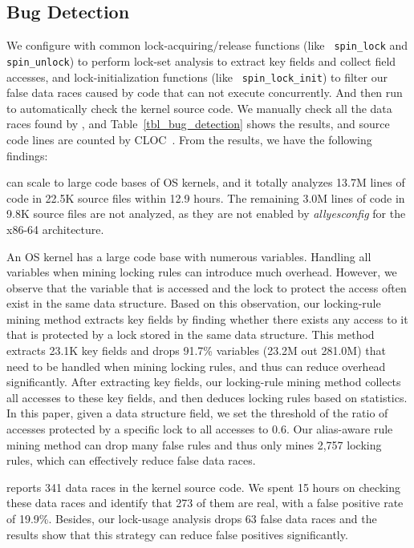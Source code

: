 \subsection{Bug Detection}
\label{subsec_bug_detection}

We configure \sys with common lock-acquiring/release functions (like {\tt 
spin\_lock} and {\tt spin\_unlock}) to perform lock-set analysis to extract key 
fields and collect field accesses, and lock-initialization functions (like {\tt 
spin\_lock\_init}) to filter our false data races caused by code that can not 
execute concurrently. And then run \sys to automatically check the kernel 
source code. We manually check all the data races found by \sys, and 
Table~\ref{tbl_bug_detection} shows the results, and source code lines are 
counted by CLOC~\cite{cloc}. From the results, we have the following findings:

 \sys can scale to large code bases of OS kernels, and it 
totally analyzes 13.7M lines of code in 22.5K source files within 12.9 hours. 
The remaining 3.0M lines of code in 9.8K source files are not analyzed, as they 
are not enabled by {\em allyesconfig} for the x86-64 architecture.

 An OS kernel has a large code base with numerous 
variables. Handling all variables when mining locking rules can introduce much 
overhead. However, we observe that the variable that is accessed and the lock 
to protect the access often exist in the same data structure. Based on this 
observation, our locking-rule mining method extracts key fields by finding 
whether there exists any access to it that is protected by a lock stored in the 
same data structure. This method extracts 23.1K key fields and drops 91.7\% 
variables (23.2M out 281.0M) that need to be handled when mining locking rules, 
and thus can reduce overhead significantly. After extracting key fields, our 
locking-rule mining method collects all accesses to these key fields, and then 
deduces locking rules based on statistics. In this paper, given a data 
structure field, we set the threshold of the ratio of accesses protected by a 
specific lock to all accesses to 0.6. Our alias-aware rule mining method can 
drop many false rules and thus only mines 2,757 locking rules, which can 
effectively reduce false data races.

 \sys reports 341 data races in the kernel source 
code. We spent 15 hours on checking these data races and identify that 273 of 
them are real, with a false positive rate of 19.9\%. Besides, our lock-usage 
analysis drops 63 false data races and the results show that this strategy can 
reduce false positives significantly.

